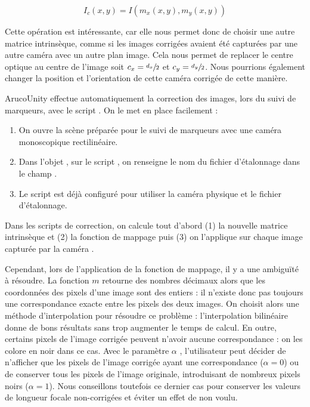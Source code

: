 \begin{equation}
  \label{eq:undistortion}
  I_c(x,y) = I(m_x(x,y), m_y(x,y))
\end{equation}

Cette opération est intéressante, car elle nous permet donc de choisir une autre matrice intrinsèque, comme si les images corrigées avaient été capturées par une autre caméra avec un autre plan image. Cela nous permet de replacer le centre optique au centre de l'image soit $c_x = \sfrac{d_x}{2}$ et $c_y = \sfrac{d_y}{2}$. Nous pourrions également changer la position et l'orientation de cette caméra corrigée de cette manière.

ArucoUnity effectue automatiquement la correction des images, lors du suivi de marqueurs, avec le script . On le met en place facilement  :
\begin{enumerate}
  \item On ouvre la scène  préparée pour le suivi de marqueurs avec une caméra monoscopique rectilinéaire.
  \item Dans l'objet , sur le script , on renseigne le nom du fichier d'étalonnage dans le champ .
  \item Le script  est déjà configuré pour utiliser la caméra physique et le fichier d'étalonnage.
\end{enumerate}
\medskip

Dans les scripts de correction, on calcule tout d'abord (1) la nouvelle matrice intrinsèque et (2) la fonction de mappage  puis (3) on l'applique sur chaque image capturée par la caméra .

Cependant, lors de l'application de la fonction de mappage, il y a une ambiguïté à résoudre. La fonction $m$ retourne des nombres décimaux alors que les coordonnées des pixels d'une image sont des entiers : il n'existe donc pas toujours une correspondance exacte entre les pixels des deux images. On choisit alors une méthode d'interpolation pour résoudre ce problème : l'interpolation bilinéaire donne de bons résultats sans trop augmenter le temps de calcul. En outre, certains pixels de l'image corrigée peuvent n'avoir aucune correspondance : on les colore en noir dans ce cas. Avec le paramètre $\alpha$ , l'utilisateur peut décider de n'afficher que les pixels de l'image corrigée ayant une correspondance ($\alpha = 0$) ou de conserver tous les pixels de l'image originale, introduisant de nombreux pixels noirs ($\alpha = 1$). Nous conseillons toutefois ce dernier cas pour conserver les valeurs de longueur focale non-corrigées et éviter un effet de  non voulu.

